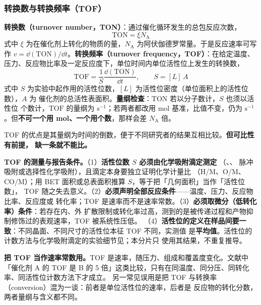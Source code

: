 \subsubsection{转换数与转换频率（TOF）}

\begin{principle}
\textbf{转换数（turnover number，TON）}：通过催化循环发生的总包反应次数，
\begin{equation}
\mathrm{TON}=\xi N_{\mathrm A}
\label{eq:ton}
\end{equation}
式中 $\xi$ 为在催化剂上转化的物质的量，$N_{\mathrm A}$ 为阿伏伽德罗常量。于是反应速率可写作
$v=\dd(\mathrm{TON})/\dd t$。\textbf{转换频率（turnover frequency，TOF）}：在给定温度、
压力、反应物比率及一定反应度下，单位时间内单位活性位上发生的转换数，
\begin{equation}
\mathrm{TOF}=\frac{1}{S}\frac{\dd(\mathrm{TON})}{\dd t},
\qquad S=[L]\,A
\label{eq:tof}
\end{equation}
式中 $S$ 为实验中起作用的活性位数，$[L]$ 为活性位密度（单位面积上的活性位数），$A$ 为
催化剂的总活性表面积。\textbf{量纲检查}：$\mathrm{TON}$ 若以分子数计，$S$ 也须以活性位
个数计，$\mathrm{TOF}$ 的量纲为 $\mathrm{s^{-1}}$；若两者都改用 mol 基准，比值不变，仍为
$\mathrm{s^{-1}}$。但\textbf{不可一个用 mol、一个用个数}，那样会差 $N_{\mathrm A}$ 倍。
\end{principle}

TOF 的优点是其量纲为时间的倒数，便于不同研究者的结果互相比较。\textbf{但可比性有前提，
缺一条就不能比。}

\begin{measure}
\textbf{TOF 的测量与报告条件。}（1）\textbf{活性位数 $S$ 必须由化学吸附滴定测定}
（、、 脉冲吸附或选择性化学吸附），且滴定本身要独立证明化学计量比
（H/M、O/M、CO/M）；用 BET 面积或总表面积推算 $S$，等于把「几何面积」当作「活性位数」，
TOF 随之失去意义。（2）\textbf{必须声明全部反应条件}——温度、压力、反应物比率、反应度或
转化率；TOF 是速率而不是速率常数。（3）\textbf{必须取微分（低转化率）条件}：若存在内、外
扩散限制或转化率过高，测到的是被传递过程和产物抑制修饰过的表观速率，TOF 被系统性压低。
（4）\textbf{活性位的定义在样品间要一致}：不同晶面、不同尺寸的活性位本征 TOF 不同，实测值
是\textbf{平均值}。活性位的计数方法与化学吸附滴定的实验细节见；本分片只
使用其结果，不重复推导。
\end{measure}

\begin{pitfall}
\textbf{把 TOF 当作速率常数用。}TOF 是速率，随压力、组成和覆盖度变化。文献中「催化剂 A 的
TOF 是 B 的 5 倍」这类比较，只有在同温度、同分压、同转化率、同活性位计数方法下才成立。
另一常见误用是把 TOF 与转换率（conversion）混为一谈：前者是单位活性位的速率，后者是
反应物的转化分数，两者量纲与含义都不同。
\end{pitfall}

